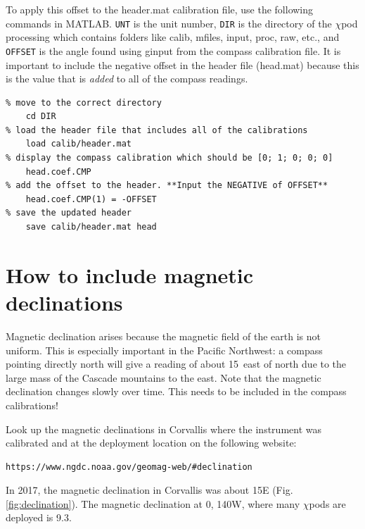 To apply this offset to the header.mat calibration file, use the following commands in MATLAB. \texttt{UNT} is the unit number, \texttt{DIR} is the directory of the $\chi$pod processing which contains folders like calib, mfiles, input, proc, raw, etc., and \texttt{OFFSET} is the angle found using ginput from the compass calibration file. It is important to include the negative offset in the header file (head.mat) because this is the value that is \textit{added} to all of the compass readings.

\begin{verbatim}
% move to the correct directory
    cd DIR
% load the header file that includes all of the calibrations
    load calib/header.mat
% display the compass calibration which should be [0; 1; 0; 0; 0]
    head.coef.CMP
% add the offset to the header. **Input the NEGATIVE of OFFSET**
    head.coef.CMP(1) = -OFFSET
% save the updated header
    save calib/header.mat head
\end{verbatim}



\section{How to include magnetic declinations}

Magnetic declination arises because the magnetic field of the earth is not uniform. This is especially important in the Pacific Northwest: a compass pointing directly north will give a reading of about 15\degree \, east of north due to the large mass of the Cascade mountains to the east. Note that the magnetic declination changes slowly over time. This needs to be included in the compass calibrations!

Look up the magnetic declinations in Corvallis where the instrument was calibrated and at the deployment location on the following website:
\begin{verbatim}
https://www.ngdc.noaa.gov/geomag-web/#declination
\end{verbatim}
In 2017, the magnetic declination in Corvallis was about 15\degree E (Fig. \ref{fig:declination}). The magnetic declination at 0\degree, 140\degree W, where many $\chi$pods are deployed is 9.3\degree.

